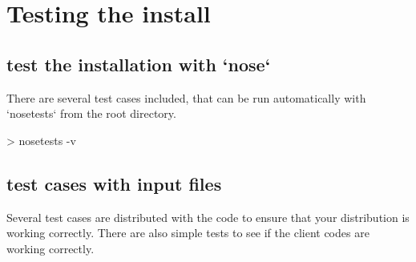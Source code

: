 \documentclass[11pt,english,fleqn]{report}
\newenvironment{code}{%
\footnotesize 
\verbatim
}{
\endverbatim
\normalsize
}
\begin{document}
\section{Testing the install}

\label{tests}

\subsection{test the installation with `nose`}

There are several test cases included, that can be run automatically with
`nosetests` from the root directory.

\begin{code}
> nosetests -v
\end{code}

\subsection{test cases with input files}

Several test cases are distributed with the code to ensure that your
distribution is working correctly. There are also simple tests to
see if the client codes are working correctly.
\end{document}
